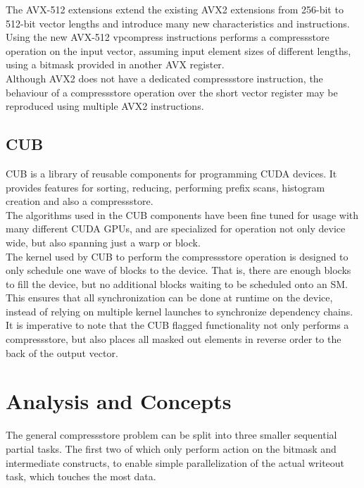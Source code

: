 \documentclass{tudscrreprt}
\begin{document}
			The AVX-512 extensions extend the existing AVX2 extensions from 256-bit to 512-bit vector lengths and introduce many new characteristics and instructions. Using the new AVX-512 vpcompress instructions performs a compressstore operation on the input vector, assuming input element sizes of different lengths, using a bitmask provided in another AVX register. \\
			
			Although AVX2 does not have a dedicated compressstore instruction, the behaviour of a compressstore operation over the short vector register may be reproduced using multiple AVX2 instructions. \\
		
		\section{CUB}
			CUB is a library of reusable components for programming CUDA devices. It provides features for sorting, reducing, performing prefix scans, histogram creation and also a compressstore. \\
			The algorithms used in the CUB components have been fine tuned for usage with many different CUDA GPUs, and are specialized for operation not only device wide, but also spanning just a warp or block. \\
			
			The kernel used by CUB to perform the compressstore operation is designed to only schedule one wave of blocks to the device. That is, there are enough blocks to fill the device, but no additional blocks waiting to be scheduled onto an SM. This ensures that all synchronization can be done at runtime on the device, instead of relying on multiple kernel launches to synchronize dependency chains. \\
			
			It is imperative to note that the CUB flagged functionality not only performs a compressstore, but also places all masked out elements in reverse order to the back of the output vector. \\
		
	\chapter{Analysis and Concepts}
		The general compressstore problem can be split into three smaller sequential partial tasks. The first two of which only perform action on the bitmask and intermediate constructs, to enable simple parallelization of the actual writeout task, which touches the most data. \\
		
\end{document}
